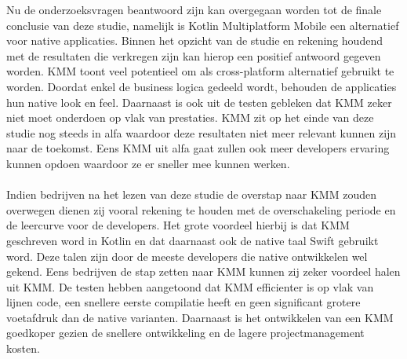 Nu de onderzoeksvragen beantwoord zijn kan overgegaan worden tot de finale conclusie van deze studie, namelijk is Kotlin Multiplatform Mobile een alternatief voor native applicaties. Binnen het opzicht van de studie en rekening houdend met de resultaten die verkregen zijn kan hierop een positief antwoord gegeven worden. KMM toont veel potentieel om als cross-platform alternatief gebruikt te worden. Doordat enkel de business logica gedeeld wordt, behouden de applicaties hun native look en feel. Daarnaast is ook uit de testen gebleken dat KMM zeker niet moet onderdoen op vlak van prestaties. KMM zit op het einde van deze studie nog steeds in alfa waardoor deze resultaten niet meer relevant kunnen zijn naar de toekomst. Eens KMM uit alfa gaat zullen ook meer developers ervaring kunnen opdoen waardoor ze er sneller mee kunnen werken.
\\ \\
Indien bedrijven na het lezen van deze studie de overstap naar KMM zouden overwegen dienen zij vooral rekening te houden met de overschakeling periode en de leercurve voor de developers. Het grote voordeel hierbij is dat KMM geschreven word in Kotlin en dat daarnaast ook de native taal Swift gebruikt word. Deze talen zijn door de meeste developers die native ontwikkelen wel gekend. Eens bedrijven de stap zetten naar KMM kunnen zij zeker voordeel halen uit KMM. De testen hebben aangetoond dat KMM efficienter is op vlak van lijnen code, een snellere eerste compilatie heeft en geen significant grotere voetafdruk dan de native varianten. Daarnaast is het ontwikkelen van een KMM goedkoper gezien de snellere ontwikkeling en de lagere projectmanagement kosten.


    


